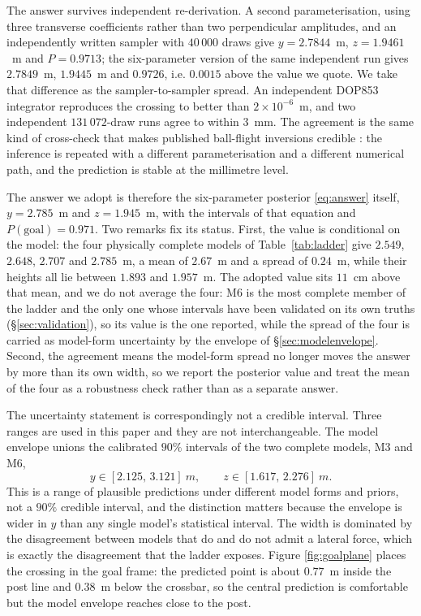 The answer survives independent re-derivation. A second parameterisation, using
three transverse coefficients rather than two perpendicular amplitudes, and an
independently written sampler with $40\,000$ draws give $y=2.7844$~m,
$z=1.9461$~m and $P=0.9713$; the six-parameter version of the same independent
run gives $2.7849$~m, $1.9445$~m and $0.9726$, i.e. $0.0015$ above the value we
quote. We take that difference as the sampler-to-sampler spread. An independent DOP853 integrator
reproduces the crossing to better than $2\times10^{-6}$~m, and two independent
$131\,072$-draw runs agree to within $3$~mm. The agreement is the same kind of
cross-check that makes published ball-flight inversions credible
\citep{nathan2008pitchfx,florio2019}: the inference is repeated with a different
parameterisation and a different numerical path, and the prediction is stable at
the millimetre level.

The answer we adopt is therefore the six-parameter posterior
\eqref{eq:answer} itself, $y=2.785$~m and $z=1.945$~m, with the intervals of
that equation and $P(\text{goal})=0.971$. Two remarks fix its status. First,
the value is conditional on the model: the four physically complete models of
Table~\ref{tab:ladder} give $2.549$, $2.648$, $2.707$ and $2.785$~m, a mean of
$2.67$~m and a spread of $0.24$~m, while their heights all lie between $1.893$
and $1.957$~m. The adopted value sits $11$~cm above that mean, and we do not
average the four: M6 is the most complete member of the ladder and the only one
whose intervals have been validated on its own truths (\S\ref{sec:validation}),
so its value is the one reported, while the spread of the four is carried as
model-form uncertainty by the envelope of \S\ref{sec:modelenvelope}. Second,
the agreement means the model-form spread no longer moves the answer by more
than its own width, so we report the posterior value and treat the mean of the
four as a robustness check rather than as a separate answer.

The uncertainty statement is correspondingly not a credible interval. Three
ranges are used in this paper and they are not interchangeable. The model
envelope unions the calibrated $90\%$ intervals of the two complete models, M3
and M6,
\begin{equation}
  y\in[2.125,\,3.121]~\si{m}, \qquad z\in[1.617,\,2.276]~\si{m}.
  \label{eq:modelenvelope}
\end{equation}
\label{sec:modelenvelope}
This is a range of plausible predictions under different model forms and priors,
not a $90\%$ credible interval, and the distinction matters because the envelope
is wider in $y$ than any single model's statistical interval. The width is
dominated by the disagreement between models that do and do not admit a lateral
force, which is exactly the disagreement that the ladder exposes. Figure
\ref{fig:goalplane} places the crossing in the goal frame: the predicted point is
about $0.77$~m inside the post line and $0.38$~m below the crossbar, so the
central prediction is comfortable but the model envelope reaches close to the
post.

